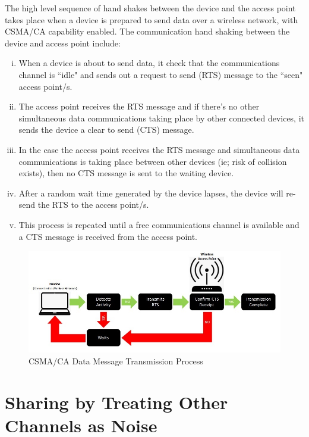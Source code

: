 The high level sequence of hand shakes between the device and the access
point takes place when a device is  prepared to send data over a wireless
network, with CSMA/CA capability enabled. The communication hand shaking
between the device and access point include:

\begin{enumerate}[(i)]

\item When a device is about to send data, it check that the communications 
channel is ``idle" and sends out a request to send (RTS) message to the ``seen" access point/s.
\item The access point receives the RTS message and if there's no other 
simultaneous data communications taking place by other connected devices, 
it sends the device a clear to send (CTS) message.
\item In the case the access point receives the RTS message and simultaneous 
data communications is taking place between other devices (ie; risk of collision 
exists), then no CTS message is sent to the waiting device.
\item After a random wait time generated by the device lapses, the 
device will re-send the RTS to the access point/s.
\item This process is repeated until a free communications channel is 
available and a CTS message is received from the access point.

\end{enumerate}

\begin{figure}
\centering
	\includegraphics[width=12cm]{CSMA_CA}
	\caption{CSMA/CA Data Message Transmission Process}
	\label{CSMA_CA}
\end{figure}


\section{Sharing by Treating Other Channels as Noise}

